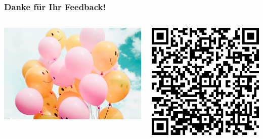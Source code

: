 \documentclass{beamer}
\begin{document}

\begin{frame}
\frametitle{Danke für Ihr Feedback!}

\begin{columns}[c]

\begin{column}{6cm}
\begin{center}
 \includegraphics[width=\textwidth]{smilie_balloons.jpg}
\end{center}

\end{column}

\begin{column}{4cm}


\begin{center}
\includegraphics[width=\textwidth]{feedback_QR.png}
\end{center}
\end{column}


\end{columns}

\end{frame}
\end{document}
